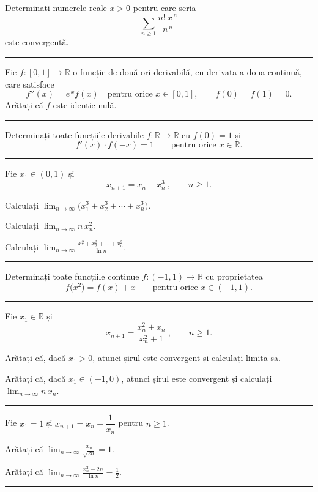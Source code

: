 Determinați numerele reale $x>0$ pentru care seria
\[ \sum_{n\ge1}\frac{n!\ x^{\,n}}{n^{\,n}} \]
este convergentă.
\vspace{1mm}\hrule

Fie $f:[0,1]\to\mathbb{R}$ o funcție de două ori derivabilă, cu derivata a doua continuă, care satisface
\[ f''(x)=e^{\,x}f(x)\quad\text{pentru orice }x\in[0,1],\qquad f(0)=f(1)=0 . \]
Arătați că $f$ este identic nulă.
\vspace{1mm}\hrule

Determinați toate funcțiile derivabile $f:\mathbb{R}\to\mathbb{R}$ cu $f(0)=1$ și
\[ f'(x)\cdot f(-x)=1\qquad\text{pentru orice }x\in\mathbb{R} . \]
\vspace{1mm}\hrule

Fie $x_{1}\in(0,1)$ și
\[ x_{n+1}=x_{n}-x_{n}^{3}\ ,\qquad n\ge1 . \]
\begin{parti}
  \item Calculați $\displaystyle\lim_{n\to\infty}\bigl(x_{1}^{3}+x_{2}^{3}+\cdots+x_{n}^{3}\bigr)$.
  \item Calculați $\displaystyle\lim_{n\to\infty}n\,x_{n}^{2}$.
  \item Calculați $\displaystyle\lim_{n\to\infty}\frac{x_{1}^{2}+x_{2}^{2}+\cdots+x_{n}^{2}}{\ln n}$.
\end{parti}
\vspace{1mm}\hrule

Determinați toate funcțiile continue $f:(-1,1)\to\mathbb{R}$ cu proprietatea
\[ f\bigl(x^{2}\bigr)=f(x)+x\qquad\text{pentru orice }x\in(-1,1) . \]
\vspace{1mm}\hrule

Fie $x_1\in\mathbb{R}$ și
\[ x_{n+1}=\frac{x_n^{2}+x_n}{x_n^{2}+1}\ ,\qquad n\ge1 . \]
\begin{parti}
  \item Arătați că, dacă $x_1>0$, atunci șirul este convergent și calculați limita sa.
  \item Arătați că, dacă $x_1\in(-1,0)$, atunci șirul este convergent și calculați $\displaystyle\lim_{n\to\infty}n\,x_n$.
\end{parti}
\vspace{1mm}\hrule

Fie $x_1=1$ și $x_{n+1}=x_n+\dfrac{1}{x_n}$ pentru $n\ge1$.
\begin{parti}
  \item Arătați că $\displaystyle\lim_{n\to\infty}\frac{x_n}{\sqrt{2n}}=1$.
  \item Arătați că $\displaystyle\lim_{n\to\infty}\frac{x_n^{2}-2n}{\ln n}=\frac12$.
\end{parti}
\vspace{1mm}\hrule

